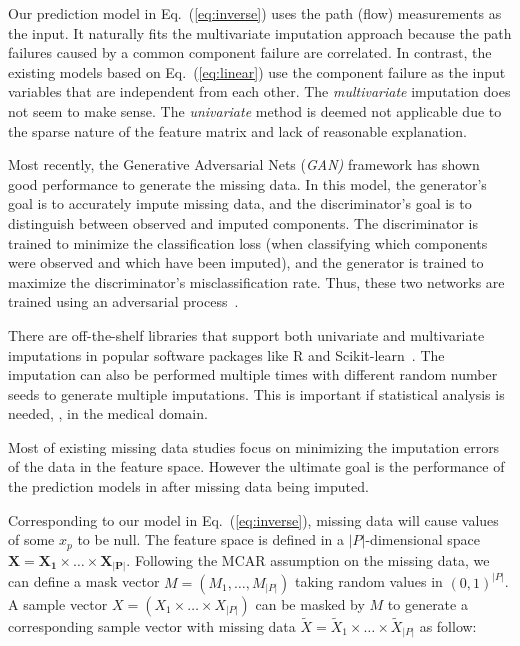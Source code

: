 Our prediction model in Eq.~(\ref{eq:inverse})  uses the path (flow) measurements as the input. It naturally fits the multivariate imputation approach 
because the path failures caused by a common component failure are correlated. In contrast, the existing models based on Eq.~(\ref{eq:linear}) use the 
component failure as the input variables that are independent from each other. The {\it multivariate} imputation does not seem to make sense.
The {\it univariate} method is deemed not applicable due to the sparse nature of the feature matrix and lack of reasonable explanation.

Most recently,  the Generative Adversarial Nets ({\it GAN)} framework has shown good performance to generate the missing data.
In this model, the generator’s goal is to accurately impute missing data, and the discriminator’s goal is to distinguish between observed and imputed 
components. The discriminator is trained to minimize the classification loss (when classifying which components were observed and 
which have been imputed), and the generator is trained to maximize the discriminator’s misclassification rate. Thus, these 
two networks are trained using an adversarial process~\cite{Yoon2018GAINMD,Awan2021ImputationOM}.

There are off-the-shelf libraries that support both univariate and multivariate imputations in popular software packages like R and 
Scikit-learn~\cite{JSSv045i03,10.1371/journal.pone.0254720}. The imputation can also be performed multiple times with different 
random number seeds to generate multiple imputations. This is important if statistical analysis is needed, \eg, in the medical domain. 

Most of existing missing data studies focus on minimizing the imputation errors of the data in the feature space. However the ultimate goal 
is the performance of the prediction models in after missing data being imputed.

Corresponding to our model in Eq.~(\ref{eq:inverse}), missing data will cause values of some $x_p$ to be null. 
The feature space is defined in a $|P|$-dimensional space $\mathbf{X} = \mathbf{X_1} \times \ldots \times \mathbf{X_{|P|}}$. 
Following the MCAR assumption 
on the missing data, we can define a mask vector $M = (M_1, \ldots, M_{|P|})$ taking random values in ${(0, 1)}^{|P|}$.  
A sample vector $X = (X_1 \times \ldots \times X_{|P|})$ 
can be masked by $M$ to generate a corresponding sample vector with missing data $\tilde{X} = \tilde{X}_1 \times \ldots \times \tilde{X}_{|P|}$ as follow:

